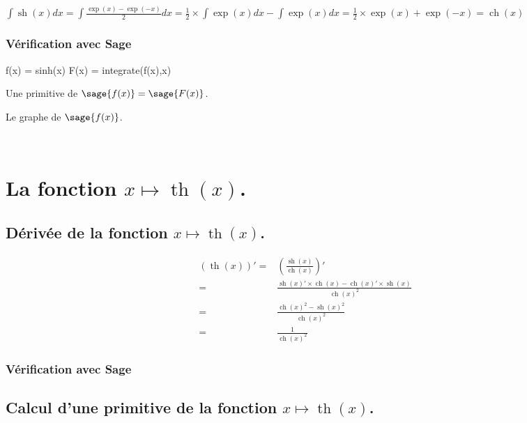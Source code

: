 \documentclass[a4paper,12pt]{report}
\renewcommand{\sinh}{\mathop{\mathrm{sh}}}
\renewcommand{\cosh}{\mathop{\mathrm{ch}}}
\renewcommand{\tanh}{\mathop{\mathrm{th}}}
\begin{document}
$\int \sinh(x) dx = \int \frac{\exp(x)- \exp(-x)}{2} dx = \frac{1}{2} \times \int \exp(x) dx - \int \exp(x) dx = \frac{1}{2} \times \exp(x) + \exp(-x) = \cosh(x)$


\subsubsection{Vérification avec Sage}

\begin{sageblock}
    f(x) = sinh(x)
    F(x) = integrate(f(x),x)
\end{sageblock}


Une primitive de $\sage{f(x)} = \sage{F(x)} $.

Le graphe de $\sage{f(x)} $.


\begin{center}
 \\
\end{center}




\section{La fonction  $x \mapsto \tanh(x)$.}

\subsection{Dérivée de la fonction $x \mapsto \tanh(x)$.}

\begin{align*}
(\tanh(x))' = & \left(\frac{\sinh(x)}{\cosh(x)}\right)' \\  = & \frac{\sinh(x)' \times \cosh(x) - \cosh(x)' \times \sinh(x)}{\cosh(x)^2} \\ = &  \frac{\cosh(x)^2 -\sinh(x)^2}{\cosh(x)^2} \\ = & \frac{1}{\cosh(x)^2}
\end{align*}


\subsubsection{Vérification avec Sage}


\subsection{Calcul d'une primitive de la fonction  $x \mapsto \tanh(x)$.}
\end{document}
